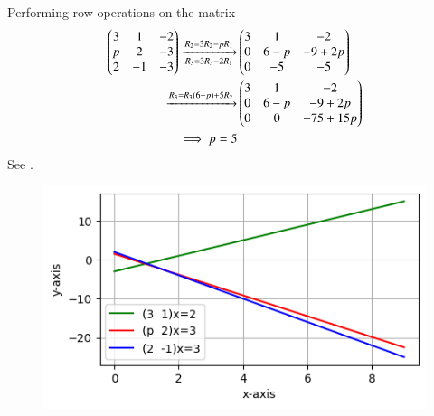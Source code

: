 Performing row operations
on the matrix
\begin{align*}  
\myvec{
    3 &1&-2 \\
     p&2&-3\\
     2&-1&-3
}
\xrightarrow[R_3=3R_3-2R_1]{R_2=3R_2-pR_1}&\myvec{
    3&1&-2\\
     $0$&6-p&-9+2p\\
     0&-5&-5}\\
 \xrightarrow{R_3=R_3(6-p)+5R_2}&\myvec{
    3&1&-2\\
     0&6-p&-9+2p\\
     0&0&-75+15p}
     \\
  \implies 
    p=5
\end{align*}
    See .
\begin{figure}[!ht]
    \centering
    \includegraphics[width=\columnwidth]{chapters/11/10/4/9/fig/11.10.4.9.png}
    \caption{}
    \label{fig:11.10.4.9}
\end{figure}

